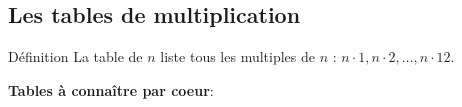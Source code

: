 
\semaineinvisible
{} 

 \vfill
\subsection{Les tables de multiplication}
 
\begin{regle}{Définition}
La table de $n$ liste tous les multiples de $n$ : $n \cdot 1, n \cdot 2, \ldots, n \cdot 12$.
\end{regle}
 
\vspace{6pt}
 \textbf{Tables à connaître par coeur}:
 
